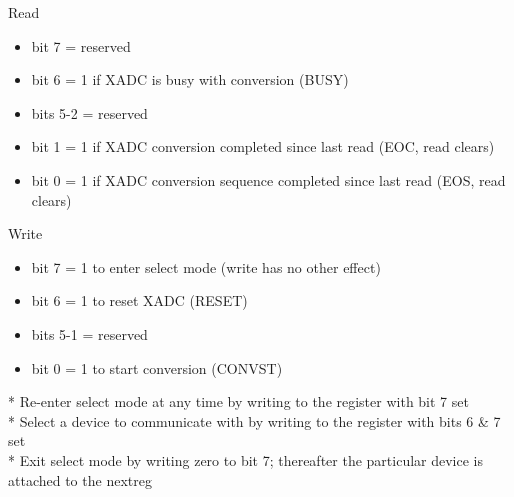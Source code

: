 \begin{itemize}
Read
\begin{itemize}
\item bit 7 = reserved
\item bit 6 = 1 if XADC is busy with conversion (BUSY)
\item bits 5-2 = reserved
\item bit 1 = 1 if XADC conversion completed since last read (EOC, read clears)
\item bit 0 = 1 if XADC conversion sequence completed since last read (EOS, read clears)
\end{itemize}
Write
\begin{itemize}
\item bit 7 = 1 to enter select mode (write has no other effect)
\item bit 6 = 1 to reset XADC (RESET)
\item bits 5-1 = reserved
\item bit 0 = 1 to start conversion (CONVST)
\end{itemize}
\end{itemize}
* Re-enter select mode at any time by writing to the register with bit 7 set\\
* Select a device to communicate with by writing to the register with bits 6 \& 7 set\\
* Exit select mode by writing zero to bit 7; thereafter the particular device is attached to the nextreg

